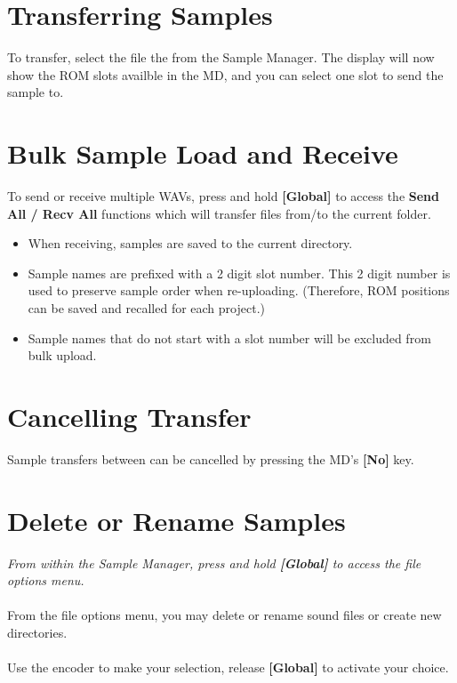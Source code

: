 \section{Transferring Samples}
To transfer, select the file the from the Sample Manager. The display will now show the ROM slots availble in the MD, and you can select one slot to send the sample to.
\section{Bulk Sample Load and Receive}
To send or receive multiple WAVs, press and hold \textbf{[Global]} to access the \textbf{Send All / Recv All} functions which will transfer files from/to the current folder.
\begin{itemize}
\item When receiving, samples are saved to the current directory.
\item Sample names are prefixed with a 2 digit slot number. This 2 digit number is used to preserve sample order when re-uploading. (Therefore, ROM positions can be saved and recalled for each project.)
\item Sample names that do not start with a slot number will be excluded from bulk upload.
\end{itemize}
\section{Cancelling Transfer}
Sample transfers between can be cancelled by pressing the MD's \textbf{[No]} key.
\newpage
\section{Delete or Rename Samples}
\textit{From within the Sample Manager, press and hold \textbf{[Global]} to access the file options menu.}\\\\
From the file options menu, you may delete or rename sound files or create new directories.\\\\
Use the encoder to make your selection, release \textbf{[Global]} to activate your choice.
